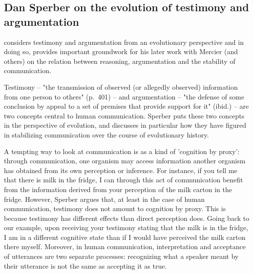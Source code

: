 
\subsection{Dan Sperber on the evolution of testimony and argumentation}

\citet{Sperber01} considers testimony and argumentation from an evolutionary perspective and in doing so, provides important groundwork for his later work with Mercier (and others) on the relation between reasoning, argumentation and the stability of communication.


Testimony -- "the transmission of observed (or allegedly observed) information from one person to others" (p.~401) -- and argumentation -- "the defense of some conclusion by appeal to a set of premises that provide support for it" (ibid.) -- are two concepts central to human communication.
Sperber puts these two concepts in the perspective of evolution, and discusses in particular how they have figured in stabilizing communication over the course of evolutionary history.

A tempting way to look at communication is as a kind of 'cognition by proxy': through communication, one organism may access information another organism has obtained from its own perception or inference. For instance, if you tell me that there is milk in the fridge, I can through this act of communication benefit from the information derived from your perception of the milk carton in the fridge.
However, Sperber argues that, at least in the case of human communication, testimony does not amount to cognition by proxy. This is because testimony has different effects than direct perception does. Going back to our example, upon receiving your testimony stating that the milk is in the fridge, I am in a different cognitive state than if I would have perceived the milk carton there myself. Moreover, in human communication, interpretation and acceptance of utterances are two separate processes: recognizing what a speaker meant by their utterance is not the same as accepting it as true.

